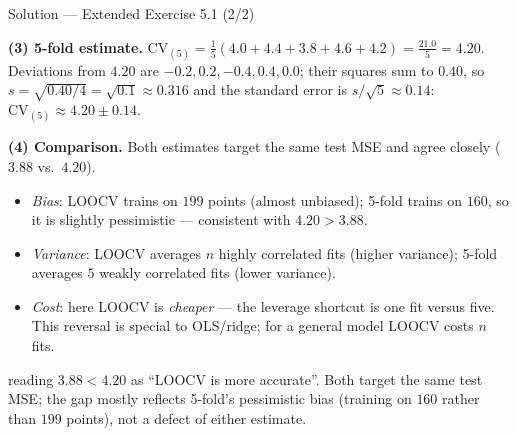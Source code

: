 \documentclass[aspectratio=169,11pt]{beamer}
\begin{document}
\begin{frame}{Solution --- Extended Exercise 5.1 (2/2)}
  \begin{solutionbox}
    \textbf{(3) 5-fold estimate.}
    $\mathrm{CV}_{(5)}=\tfrac15(4.0+4.4+3.8+4.6+4.2)=\tfrac{21.0}{5}=4.20$.
    Deviations from $4.20$ are $-0.2,0.2,-0.4,0.4,0.0$; their squares sum
    to $0.40$, so $s=\sqrt{0.40/4}=\sqrt{0.1}\approx0.316$ and the
    standard error is $s/\sqrt5\approx0.14$: $\mathrm{CV}_{(5)}\approx
    4.20\pm0.14$.

    \textbf{(4) Comparison.} Both estimates target the same test MSE and
    agree closely ($3.88$ vs.\ $4.20$).
    \begin{itemize}
      \item \emph{Bias}: LOOCV trains on $199$ points (almost unbiased);
            5-fold trains on $160$, so it is slightly pessimistic ---
            consistent with $4.20>3.88$.
      \item \emph{Variance}: LOOCV averages $n$ highly correlated fits
            (higher variance); 5-fold averages $5$ weakly correlated
            fits (lower variance).
      \item \emph{Cost}: here LOOCV is \emph{cheaper} --- the leverage
            shortcut is one fit versus five. This reversal is special to
            OLS/ridge; for a general model LOOCV costs $n$ fits.
    \end{itemize}
  \end{solutionbox}
  \begin{mistake}
    reading $3.88 < 4.20$ as ``LOOCV is more
    accurate''. Both target the same test MSE; the gap mostly reflects
    5-fold's pessimistic bias (training on $160$ rather than $199$
    points), not a defect of either estimate.
  \end{mistake}
\end{frame}
\end{document}
